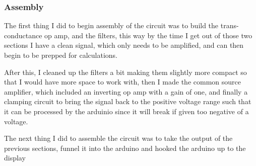 \documentclass{article}
\begin{document}
\subsubsection{Assembly}
The first thing I did to begin assembly of the circuit was to build the trans-conductance op amp, and the filters, this way by the time I get out of those two sections I have a clean signal, which only needs to be amplified, and can then begin to be prepped for calculations.
\begin{center}
\end{center}
After this, I cleaned up the filters a bit making them slightly more compact so that I would have more space to work with, then I made the common source amplifier, which included an inverting op amp with a gain of one, and finally a clamping circuit to bring the signal back to the positive voltage range such that it can be processed by the arduinio since it will break if given too negative of a voltage.
\begin{center}
\end{center}
The next thing I did to assemble the circuit was to take the output of the previous sections, funnel it into the arduino and hooked the arduino up to the display
\begin{center}
\end{center}
\end{document}
